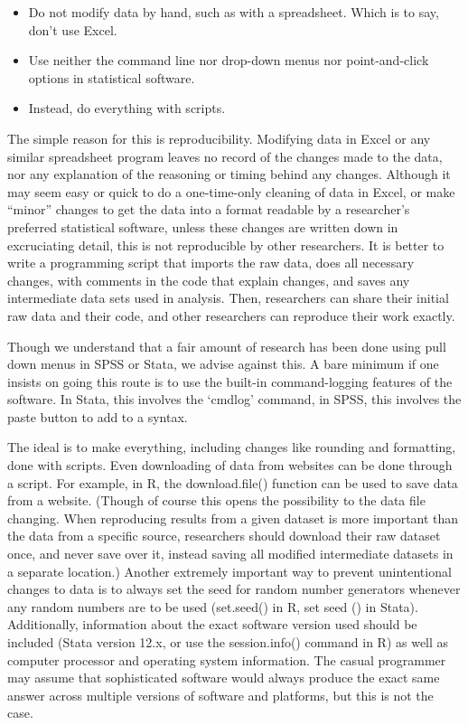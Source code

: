 \documentclass[12pt] {article}
\begin{document}
\begin{itemize}
\item
  Do not modify data by hand, such as with a spreadsheet. Which is to
  say, don't use Excel.
\item
  Use neither the command line nor drop-down menus nor point-and-click
  options in statistical software.
\item
  Instead, do everything with scripts.
\end{itemize}

The simple reason for this is reproducibility. Modifying data in Excel
or any similar spreadsheet program leaves no record of the changes made
to the data, nor any explanation of the reasoning or timing behind any
changes. Although it may seem easy or quick to do a one-time-only
cleaning of data in Excel, or make ``minor'' changes to get the data
into a format readable by a researcher's preferred statistical software,
unless these changes are written down in excruciating detail, this is
not reproducible by other researchers. It is better to write a programming
script that imports the raw data, does all necessary changes, with
comments in the code that explain changes, and saves any intermediate
data sets used in analysis. Then, researchers can share their initial
raw data and their code, and other researchers can reproduce their work
exactly.

Though we understand that a fair amount of research has been done using
pull down menus in SPSS or Stata, we advise against this. A bare minimum
if one insists on going this route is to use the built-in
command-logging features of the software. In Stata, this involves the
`cmdlog' command, in SPSS, this involves the paste button to add to a
syntax.

The ideal is to make everything, including changes like rounding and
formatting, done with scripts. Even downloading of data from websites
can be done through a script. For example, in R, the download.file()
function can be used to save data from a website. (Though of course this
opens the possibility to the data file changing. When reproducing
results from a given dataset is more important than the data from a
specific source, researchers should download their raw dataset once, and
never save over it, instead saving all modified intermediate datasets in
a separate location.) Another extremely important way to prevent
unintentional changes to data is to always set the seed for random
number generators whenever any random numbers are to be used (set.seed()
in R, set seed () in Stata). Additionally, information about the exact
software version used should be included (Stata version 12.x, or use the
session.info() command in R) as well as computer processor and operating
system information. The casual programmer may assume that sophisticated
software would always produce the exact same answer across multiple
versions of software and platforms, but this is not the case.
\end{document}
